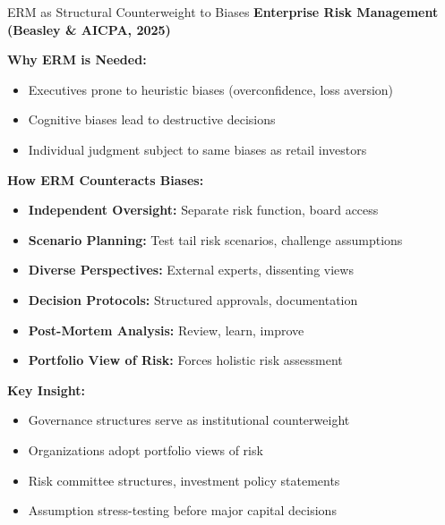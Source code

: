 \documentclass[aspectratio=169,10pt]{beamer}
\renewcommand{\small}{\fontsize{7pt}{8.5pt}\selectfont}
\renewcommand{\large}{\fontsize{9pt}{11pt}\selectfont}
\newcommand{\question}[1]{{\large\bfseries\color{crimson}#1}}
\begin{document}
	\begin{frame}{ERM as Structural Counterweight to Biases}
		\question{Enterprise Risk Management (Beasley \& AICPA, 2025)}
		\small
		
		\textbf{Why ERM is Needed:}
		\begin{itemize}
			\item Executives prone to heuristic biases (overconfidence, loss aversion)
			\item Cognitive biases lead to destructive decisions
			\item Individual judgment subject to same biases as retail investors
		\end{itemize}
		
		\vspace{0.1cm}
		\textbf{How ERM Counteracts Biases:}
		\begin{itemize}
			\item \textbf{Independent Oversight:} Separate risk function, board access
			\item \textbf{Scenario Planning:} Test tail risk scenarios, challenge assumptions
			\item \textbf{Diverse Perspectives:} External experts, dissenting views
			\item \textbf{Decision Protocols:} Structured approvals, documentation
			\item \textbf{Post-Mortem Analysis:} Review, learn, improve
			\item \textbf{Portfolio View of Risk:} Forces holistic risk assessment
		\end{itemize}
		
		\vspace{0.1cm}
		\textbf{Key Insight:}
		\begin{itemize}
			\item Governance structures serve as institutional counterweight
			\item Organizations adopt portfolio views of risk
			\item Risk committee structures, investment policy statements
			\item Assumption stress-testing before major capital decisions
		\end{itemize}
	\end{frame}
	
	
\end{document}
